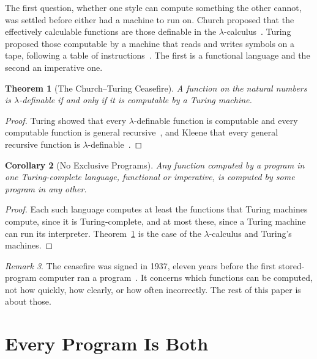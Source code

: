 \documentclass[11pt]{article}
\let\oldsection\section
\renewcommand{\section}{\Needspace{0.25\textheight}\oldsection}
\newtheorem{theorem}{Theorem}[section]
\newtheorem{corollary}[theorem]{Corollary}
\theoremstyle{definition}
\theoremstyle{remark}
\newtheorem{remark}[theorem]{Remark}
\begin{document}
The first question, whether one style can compute something the other
cannot, was settled before either had a machine to run on. Church
proposed that the effectively calculable functions are those definable
in the $\lambda$-calculus~\cite{church}. Turing proposed those computable
by a machine that reads and writes symbols on a tape, following a table
of instructions~\cite{turing36}. The first is a functional language and
the second an imperative one.

\begin{theorem}[The Church--Turing Ceasefire]\label{thm:ceasefire}
  A function on the natural numbers is $\lambda$-definable if and only if
  it is computable by a Turing machine.
\end{theorem}

\begin{proof}
  Turing showed that every $\lambda$-definable function is computable and
  every computable function is general recursive~\cite{turing37}, and
  Kleene that every general recursive function is
  $\lambda$-definable~\cite{kleene}.
\end{proof}

\begin{corollary}[No Exclusive Programs]\label{cor:exclusive}
  Any function computed by a program in one Turing-complete language,
  functional or imperative, is computed by some program in any other.
\end{corollary}

\begin{proof}
  Each such language computes at least the functions that Turing machines
  compute, since it is Turing-complete, and at most these, since a Turing
  machine can run its interpreter. Theorem~\ref{thm:ceasefire} is the
  case of the $\lambda$-calculus and Turing's machines.
\end{proof}

\begin{remark}
  The ceasefire was signed in 1937, eleven years before the first
  stored-program computer ran a program~\cite{baby}. It concerns which
  functions can be computed, not how quickly, how clearly, or how often
  incorrectly. The rest of this paper is about those.
\end{remark}

\section{Every Program Is Both}\label{sec:both}
\end{document}
